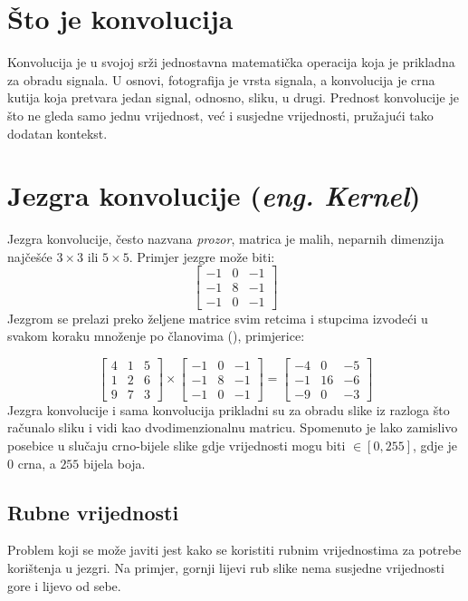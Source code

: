 \section{Što je konvolucija}
Konvolucija je u svojoj srži jednostavna matematička operacija koja je prikladna za obradu signala.
U osnovi, fotografija je vrsta signala, a konvolucija je crna kutija koja pretvara jedan signal, odnosno, sliku, u drugi.
Prednost konvolucije je što ne gleda samo jednu vrijednost, već i susjedne vrijednosti, pružajući tako dodatan kontekst.

\section{Jezgra konvolucije (\emph{eng. Kernel})}
Jezgra konvolucije, često nazvana \emph{prozor}, matrica je malih, neparnih dimenzija najčešće $3 \times 3$ ili $5 \times 5$.
Primjer jezgre može biti: 
$$
\begin{bmatrix}
	-1 & 0 & -1 \\
	-1 & 8 & -1 \\
	-1 & 0 & -1
\end{bmatrix}
$$
Jezgrom se prelazi preko željene matrice svim retcima i stupcima izvodeći u svakom koraku množenje po članovima (\cite{conv_pres}), primjerice:

\[
\begin{bmatrix}
	4 & 1 & 5\\
	1 & 2 & 6 \\
	9 & 7 & 3
\end{bmatrix}
\times
\begin{bmatrix}
	-1 & 0 & -1 \\
	-1 & 8 & -1 \\
	-1 & 0 & -1
\end{bmatrix}
=
\begin{bmatrix}
	-4 & 0 & -5\\
	-1 & 16 & -6 \\
	-9 & 0 & -3
\end{bmatrix}
\]
Jezgra konvolucije i sama konvolucija prikladni su za obradu slike iz razloga što računalo sliku i vidi kao dvodimenzionalnu matricu.
Spomenuto je lako zamislivo posebice u slučaju crno-bijele slike gdje vrijednosti mogu biti $\in [0, 255]$, gdje je $0$ crna, a $255$ bijela boja.

\subsection{Rubne vrijednosti}
Problem koji se može javiti jest kako se koristiti rubnim vrijednostima za potrebe korištenja u jezgri.
Na primjer, gornji lijevi rub slike nema susjedne vrijednosti gore i lijevo od sebe.

